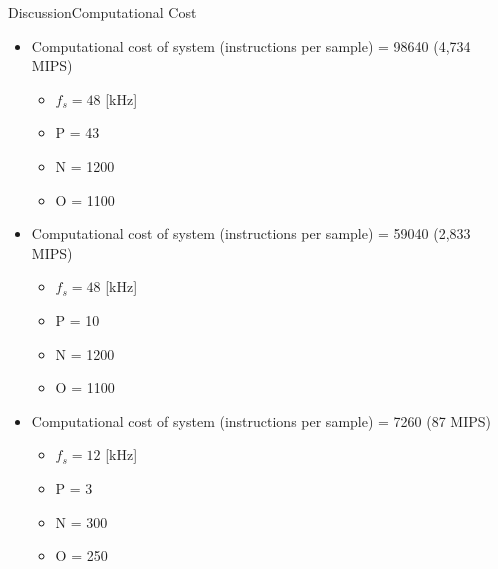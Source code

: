 \begin{frame}{Discussion}{Computational Cost}		
\begin{itemize}
\item Computational cost of system (instructions per sample) = 98640 (4,734 MIPS)
	\begin{itemize} 
		\item $f_s = 48$ [kHz]
		\item P = 43 
		\item N = 1200
		\item O = 1100
	\end{itemize}
\item Computational cost of system (instructions per sample) = 59040 (2,833 MIPS)
	\begin{itemize}
		\item $f_s = 48$ [kHz]
		\item P = 10 
		\item N = 1200
		\item O = 1100
	\end{itemize}
\item Computational cost of system (instructions per sample) = 7260 (87 MIPS)
	\begin{itemize}
		\item $f_s = 12$ [kHz]
		\item P = 3 
		\item N = 300
		\item O = 250
	\end{itemize}
\end{itemize}
\end{frame}


